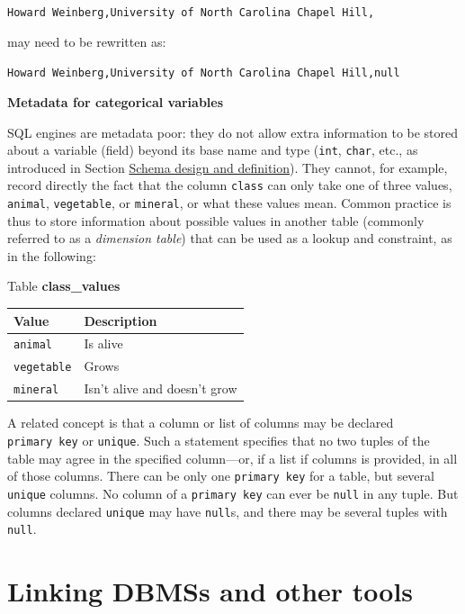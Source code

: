 \documentclass[]{krantz}
\begin{document}
\texttt{Howard\ Weinberg,University\ of\ North\ Carolina\ Chapel\ Hill,}

may need to be rewritten as:

\texttt{Howard\ Weinberg,University\ of\ North\ Carolina\ Chapel\ Hill,null}

\textbf{Metadata for categorical variables}

SQL engines are metadata poor: they do not allow extra information to be
stored about a variable (field) beyond its base name and type
(\texttt{int}, \texttt{char}, etc., as introduced in Section
\protect\hyperlink{sec:db:schema}{Schema design and definition}). They
cannot, for example, record directly the fact that the column
\texttt{class} can only take one of three values, \texttt{animal},
\texttt{vegetable}, or \texttt{mineral}, or what these values mean.
Common practice is thus to store information about possible values in
another table (commonly referred to as a \emph{dimension table}) that
can be used as a lookup and constraint, as in the following:

Table \textbf{class\_values}

\begin{longtable}[]{@{}ll@{}}
\toprule
\textbf{Value} & \textbf{Description}\tabularnewline
\midrule
\endhead
\texttt{animal} & Is alive\tabularnewline
\texttt{vegetable} & Grows\tabularnewline
\texttt{mineral} & Isn't alive and doesn't grow\tabularnewline
\bottomrule
\end{longtable}

A related concept is that a column or list of columns may be declared
\texttt{primary\ key} or \texttt{unique}. Such a statement specifies
that no two tuples of the table may agree in the specified column---or,
if a list if columns is provided, in all of those columns. There can be
only one \texttt{primary\ key} for a table, but several \texttt{unique}
columns. No column of a \texttt{primary\ key} can ever be \texttt{null}
in any tuple. But columns declared \texttt{unique} may have
\texttt{null}s, and there may be several tuples with \texttt{null}.

\section{Linking DBMSs and other
tools}\label{linking-dbmss-and-other-tools}
\end{document}
